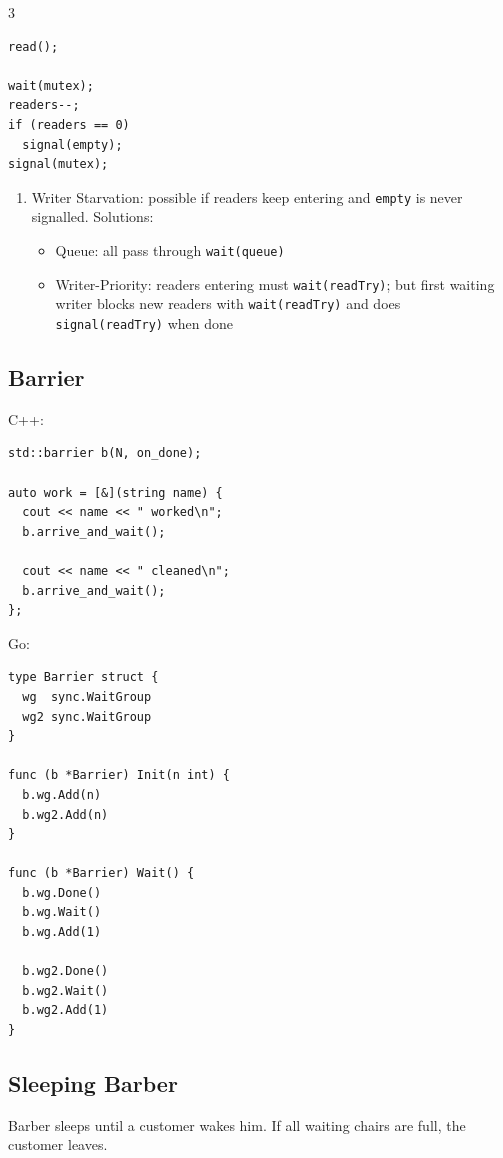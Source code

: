 \documentclass[12pt, a4paper]{article}
\begin{document}
\begin{multicols*}{3}
\begin{minipage}{0.5\columnwidth}
\begin{lstlisting}
read();

wait(mutex);
readers--;
if (readers == 0)
  signal(empty);
signal(mutex);
  \end{lstlisting}
\end{minipage}
\begin{enumerate}[$-$]
  \item Writer Starvation: possible if readers keep entering and \lstinline|empty| is never signalled. Solutions:
    \begin{itemize}[leftmargin=*]\vspace{3pt}
      \item Queue: all pass through \lstinline|wait(queue)| 
      \item Writer-Priority: readers entering must \lstinline|wait(readTry)|; but first waiting writer blocks new readers with \lstinline|wait(readTry)| and does \lstinline|signal(readTry)| when done 
    \end{itemize}
\end{enumerate}
\vspace{-1em}
\colbreak
\subsection{Barrier}
C++:
\begin{lstlisting}[style=cpp]
std::barrier b(N, on_done);

auto work = [&](string name) {
  cout << name << " worked\n";
  b.arrive_and_wait();

  cout << name << " cleaned\n";
  b.arrive_and_wait();
};
\end{lstlisting}

Go:
\begin{lstlisting}[style=go]
type Barrier struct {
  wg  sync.WaitGroup
  wg2 sync.WaitGroup
}

func (b *Barrier) Init(n int) {
  b.wg.Add(n)
  b.wg2.Add(n)
}

func (b *Barrier) Wait() {
  b.wg.Done()
  b.wg.Wait()
  b.wg.Add(1)

  b.wg2.Done()
  b.wg2.Wait()
  b.wg2.Add(1)
} 
\end{lstlisting}

\colbreak

\subsection{Sleeping Barber}
Barber sleeps until a customer wakes him. If all waiting chairs are full, the customer leaves.


\end{multicols*}
\end{document}
